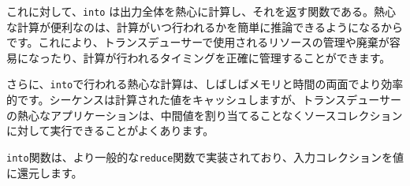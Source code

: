 これに対して、\texttt{into} は出力全体を熱心に計算し、それを返す関数である。熱心な計算が便利なのは、計算がいつ行われるかを簡単に推論できるようになるからです。これにより、トランスデューサーで使用されるリソースの管理や廃棄が容易になったり、計算が行われるタイミングを正確に管理することができます。

さらに、\texttt{into}で行われる熱心な計算は、しばしばメモリと時間の両面でより効率的です。シーケンスは計算された値をキャッシュしますが、トランスデューサーの熱心なアプリケーションは、中間値を割り当てることなくソースコレクションに対して実行できることがよくあります。

\texttt{into}関数は、より一般的な\texttt{reduce}関数で実装されており、入力コレクションを値に還元します。









\begin{lstlisting}[numbers=none]

\end{lstlisting}




